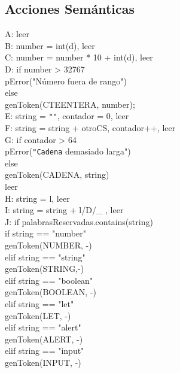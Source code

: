\documentclass[11pt, , a4paper, titlepage]{article}
\begin{document}
\subsection{Acciones Semánticas}
\begin{flushleft}
    A: leer\\
    B: number = int(d), leer\\
    C: number = number * 10 + int(d), leer\\
    D: if number >\hspace{1mm} 32767\\
    \qquad pError("Número fuera de rango")\\
    \quad else \\
    \qquad genToken(CTEENTERA, number);\\
    E: string = \verb|""|, contador = 0, leer\\
    F: string = string + otroCS, contador++, leer\\
    G: if contador >\hspace{1mm} 64\\
    \qquad pError(\verb|"Cadena| demasiado larga")\\
    \quad else\\
    \qquad genToken(CADENA, string)\\
    \quad leer\\
    H: string = l, leer\\
    I: string = string + l/D/\_ , leer\\
    J: if palabrasReservadas.contains(string)\\
    \qquad if string == "number"\\
    \qquad \quad      genToken(NUMBER, -)\\
    \qquad elif string == "string"\\
    \qquad \quad     genToken(STRING,-)\\
    \qquad  elif string == "boolean"\\
    \qquad \quad      genToken(BOOLEAN, -)\\
    \qquad    elif string == "let"\\
    \qquad \quad      genToken(LET, -)\\
    \qquad    elif string == "\phantom{}alert"\\
    \qquad \quad      genToken(ALERT, -)\\
    \qquad    elif string == "\phantom{}input"\\
    \qquad \quad      genToken(INPUT, -)\\

\end{flushleft}
\end{document}
